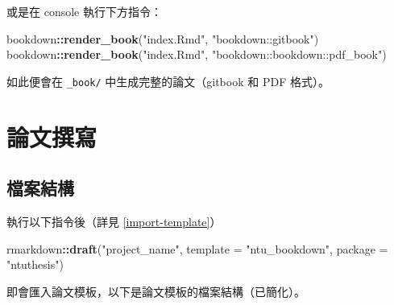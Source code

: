 \documentclass[oneside]{book}
\newenvironment{Shaded}{\begin{snugshade}}{\end{snugshade}}
\newcommand{\KeywordTok}[1]{\textcolor[rgb]{0.13,0.29,0.53}{\textbf{#1}}}
\newcommand{\DataTypeTok}[1]{\textcolor[rgb]{0.13,0.29,0.53}{#1}}
\newcommand{\StringTok}[1]{\textcolor[rgb]{0.31,0.60,0.02}{#1}}
\newcommand{\OperatorTok}[1]{\textcolor[rgb]{0.81,0.36,0.00}{\textbf{#1}}}
\newcommand{\NormalTok}[1]{#1}
\theoremstyle{definition}
\theoremstyle{definition}
\theoremstyle{definition}
\theoremstyle{remark}
\begin{document}
或是在 console 執行下方指令：

\begin{Shaded}
\begin{Highlighting}[]
\NormalTok{bookdown}\OperatorTok{::}\KeywordTok{render_book}\NormalTok{(}\StringTok{"index.Rmd"}\NormalTok{, }\StringTok{"bookdown::gitbook"}\NormalTok{)}
\NormalTok{bookdown}\OperatorTok{::}\KeywordTok{render_book}\NormalTok{(}\StringTok{"index.Rmd"}\NormalTok{, }\StringTok{"bookdown::bookdown::pdf_book"}\NormalTok{)}
\end{Highlighting}
\end{Shaded}

如此便會在 \texttt{\_book/} 中生成完整的論文（gitbook 和 PDF 格式）。

\chapter{論文撰寫}\label{write-thesis}

\section{檔案結構}\label{dir-structure}

執行以下指令後（詳見 \ref{import-template}）

\begin{Shaded}
\begin{Highlighting}[]
\NormalTok{rmarkdown}\OperatorTok{::}\KeywordTok{draft}\NormalTok{(}\StringTok{"project_name"}\NormalTok{,}
                 \DataTypeTok{template =} \StringTok{"ntu_bookdown"}\NormalTok{,}
                 \DataTypeTok{package =} \StringTok{"ntuthesis"}\NormalTok{)}
\end{Highlighting}
\end{Shaded}

即會匯入論文模板，以下是論文模板的檔案結構（已簡化）。
\end{document}

